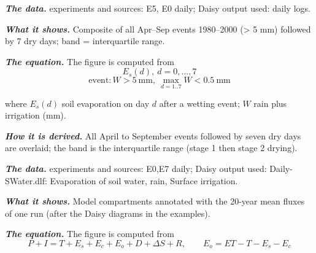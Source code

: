 \par\noindent\textbf{\color{khmag}\emph{The data.}} experiments and sources: E5, E0 daily; Daisy output used: daily logs.
\par\vspace{6pt}\noindent{}\par\nobreak
{}\label{fig:a21_5}
\par\noindent\textbf{\color{khmag}\emph{What it shows.}} Composite of all Apr--Sep events 1980--2000 (> 5 mm) followed by 7 dry days; band = interquartile range.
\par\noindent\textbf{\color{khmag}\emph{The equation.}} The figure is computed from
\begin{equation}\boxed{E_s(d),\ d=0,\dots,7}\end{equation}
\begin{equation}\boxed{\text{event}: W>5\ \mathrm{mm},\ \max_{d=1..7}W<0.5\ \mathrm{mm}}\end{equation}
\par\noindent where $E_s(d)$ soil evaporation on day $d$ after a wetting event; $W$ rain plus irrigation (mm).
\par\noindent\textbf{\color{khmag}\emph{How it is derived.}} All April to September events followed by seven dry days are overlaid; the band is the interquartile range (stage 1 then stage 2 drying).
\par\noindent\textbf{\color{khmag}\emph{The data.}} experiments and sources: E0,E7 daily; Daisy output used: Daily-SWater.dlf: Evaporation of soil water, rain, Surface irrigation.
\par\vspace{6pt}\noindent{}\par\nobreak
{}\label{fig:a21_6}
\par\noindent\textbf{\color{khmag}\emph{What it shows.}} Model compartments annotated with the 20-year mean fluxes of one run (after the Daisy diagrams in the examples).
\par\noindent\textbf{\color{khmag}\emph{The equation.}} The figure is computed from
\begin{equation}\boxed{P+I=T+E_s+E_c+E_o+D+\Delta S+R,\qquad E_o=ET-T-E_s-E_c}\end{equation}
